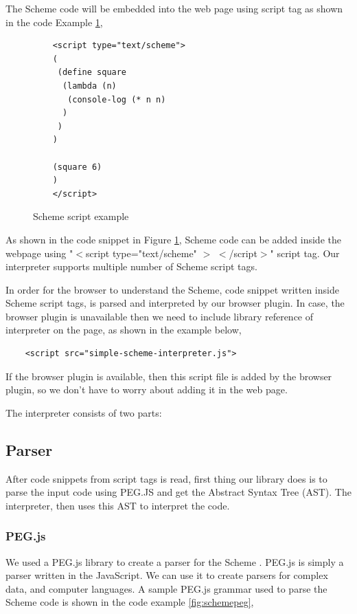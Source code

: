 The Scheme code will be embedded into the web page using script tag as shown in the code Example \ref{fig:schemescript}, 

\begin{figure}[h]
	\begin{lstlisting} 
	<script type="text/scheme">
	(
	 (define square
	  (lambda (n) 
	   (console-log (* n n)
	  ) 
	 )
	)
		
	(square 6)
	)
	</script>
	\end{lstlisting}
	\caption{Scheme script example}
	\label{fig:schemescript}
\end{figure}



As shown in the code snippet in Figure \ref{fig:schemescript}, Scheme code can be added inside the webpage using "$<$script type="text/scheme" $>$ $<$/script$>$" script tag. Our interpreter supports multiple number of Scheme script tags.

In order for the browser to understand the Scheme, code snippet written inside Scheme script tags, is parsed and interpreted by our browser plugin. In case, the browser plugin is unavailable then we need to include library reference of interpreter on the page, as shown in the example below, 

\begin{lstlisting}
	<script src="simple-scheme-interpreter.js">
\end{lstlisting}

If the browser plugin is available, then this script file is added by the browser plugin, so we don't have to worry about adding it in the web page.

The interpreter consists of two parts:

\subsection{Parser}

After code snippets from script tags is read, first thing our library does is to parse the input code using PEG.JS and get the Abstract Syntax Tree (AST). The interpreter, then uses this AST to interpret the code.

\subsubsection{PEG.js}

We used a PEG.js library to create a parser for the Scheme \cite{pegjs}. PEG.js is simply a parser written in the JavaScript. We can use it to create parsers for complex data, and computer languages. A sample PEG.js grammar used to parse the Scheme code is shown in the code example \ref{fig:schemepeg},


